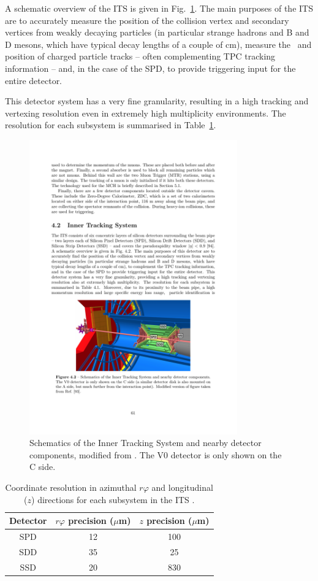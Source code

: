 A schematic overview of the ITS is given in Fig.~\ref{fig:ITS}. The main purposes of the ITS are to accurately measure the position of the collision vertex and secondary vertices from weakly decaying particles (in particular strange hadrons and B and D mesons, which have typical decay lengths of a couple of cm), measure the \pt~and position of charged particle tracks -- often complementing TPC tracking information -- and, in the case of the SPD, to provide triggering input for the entire detector. 

This detector system has a very fine granularity, resulting in a high tracking and vertexing resolution even in extremely high multiplicity environments. The resolution for each subsystem is summarised in Table~\ref{tab:its}. 

\begin{figure}[htpb]
  \centering
  \includegraphics[width=0.8\textwidth]{Experimental_Aparatus/ITS.pdf}
  \caption{Schematics of the Inner Tracking System and nearby detector components, modified from \cite{Tauro2017}. The V0 detector is only shown on the C side.}
  \label{fig:ITS}
\end{figure}

\begin{table}
\centering
\begin{tabular}{ c c c }
        \hline
	Detector & $r\varphi$ precision ($\mu$m) & $z$ precision ($\mu$m)\\
	\hline
	SPD & 12 & 100 \\
	SDD & 35 & 25 \\
	SSD & 20 & 830 \\
	\hline
\end{tabular}
  \caption{Coordinate resolution in azimuthal $r\varphi$ and longitudinal ($z$) directions for each subsystem in the ITS \cite{Contin_2012}.}
  \label{tab:its}
\end{table}


